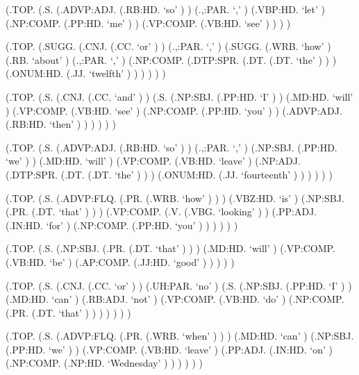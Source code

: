 \documentclass[10pt]{article}
\begin{document}
\begin{parsetree}  (.TOP. (.S. (.ADVP:ADJ. (.RB:HD. `so' ) ) (.,:PAR. `,' ) (.VBP:HD. `let' ) (.NP:COMP. (.PP:HD. `me' ) ) (.VP:COMP. (.VB:HD. `see' ) ) ) ) \end{parsetree}

\begin{parsetree}  (.TOP. (.SUGG. (.CNJ. (.CC. `or' ) ) (.,:PAR. `,' ) (.SUGG. (.WRB. `how' ) (.RB. `about' ) (.,:PAR. `,' ) (.NP:COMP. (.DTP:SPR. (.DT. (.DT. `the' ) ) ) (.ONUM:HD. (.JJ. `twelfth' ) ) ) ) ) ) \end{parsetree}

\begin{parsetree}  (.TOP. (.S. (.CNJ. (.CC. `and' ) ) (.S. (.NP:SBJ. (.PP:HD. `I' ) ) (.MD:HD. `will' ) (.VP:COMP. (.VB:HD. `see' ) (.NP:COMP. (.PP:HD. `you' ) ) (.ADVP:ADJ. (.RB:HD. `then' ) ) ) ) ) ) \end{parsetree}

\begin{parsetree}  (.TOP. (.S. (.ADVP:ADJ. (.RB:HD. `so' ) ) (.,:PAR. `,' ) (.NP:SBJ. (.PP:HD. `we' ) ) (.MD:HD. `will' ) (.VP:COMP. (.VB:HD. `leave' ) (.NP:ADJ. (.DTP:SPR. (.DT. (.DT. `the' ) ) ) (.ONUM:HD. (.JJ. `fourteenth' ) ) ) ) ) ) \end{parsetree}

\begin{parsetree}  (.TOP. (.S. (.ADVP:FLQ. (.PR. (.WRB. `how' ) ) ) (.VBZ:HD. `is' ) (.NP:SBJ. (.PR. (.DT. `that' ) ) ) (.VP:COMP. (.V. (.VBG. `looking' ) ) (.PP:ADJ. (.IN:HD. `for' ) (.NP:COMP. (.PP:HD. `you' ) ) ) ) ) ) \end{parsetree}

\begin{parsetree}  (.TOP. (.S. (.NP:SBJ. (.PR. (.DT. `that' ) ) ) (.MD:HD. `will' ) (.VP:COMP. (.VB:HD. `be' ) (.AP:COMP. (.JJ:HD. `good' ) ) ) ) ) \end{parsetree}

\begin{parsetree}  (.TOP. (.S. (.CNJ. (.CC. `or' ) ) (.UH:PAR. `no' ) (.S. (.NP:SBJ. (.PP:HD. `I' ) ) (.MD:HD. `can' ) (.RB:ADJ. `not' ) (.VP:COMP. (.VB:HD. `do' ) (.NP:COMP. (.PR. (.DT. `that' ) ) ) ) ) ) ) \end{parsetree}

\begin{parsetree}  (.TOP. (.S. (.ADVP:FLQ. (.PR. (.WRB. `when' ) ) ) (.MD:HD. `can' ) (.NP:SBJ. (.PP:HD. `we' ) ) (.VP:COMP. (.VB:HD. `leave' ) (.PP:ADJ. (.IN:HD. `on' ) (.NP:COMP. (.NP:HD. `Wednesday' ) ) ) ) ) ) \end{parsetree}
\end{document}
